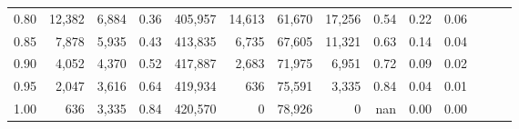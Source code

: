 \begin{tabular}{rrrrrrrrrrrrrr}
0.80 &  12,382 &  6,884 &  0.36 &  405,957 &   14,613 &  61,670 &  17,256 &  0.54 &  0.22 &      0.06 \\
0.85 &   7,878 &  5,935 &  0.43 &  413,835 &    6,735 &  67,605 &  11,321 &  0.63 &  0.14 &      0.04 \\
0.90 &   4,052 &  4,370 &  0.52 &  417,887 &    2,683 &  71,975 &   6,951 &  0.72 &  0.09 &      0.02 \\
0.95 &   2,047 &  3,616 &  0.64 &  419,934 &      636 &  75,591 &   3,335 &  0.84 &  0.04 &      0.01 \\
1.00 &     636 &  3,335 &  0.84 &  420,570 &        0 &  78,926 &       0 &   nan &  0.00 &      0.00 \\
\bottomrule
\end{tabular}
